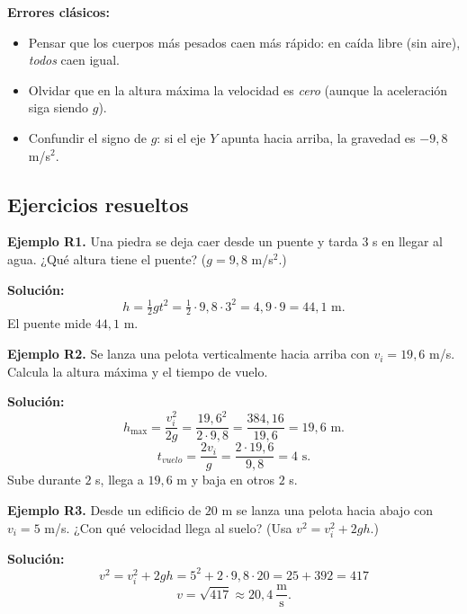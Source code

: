 \documentclass[12pt, letterpaper]{article}
\begin{document}
\begin{cuadroadvertencia}
  \textbf{Errores clásicos:}
  \begin{itemize}[leftmargin=*]
    \item Pensar que los cuerpos más pesados caen más rápido: en caída libre (sin aire), \emph{todos} caen igual.
    \item Olvidar que en la altura máxima la velocidad es \emph{cero} (aunque la aceleración siga siendo $g$).
    \item Confundir el signo de $g$: si el eje $Y$ apunta hacia arriba, la gravedad es $-9{,}8$ m/s$^2$.
  \end{itemize}
\end{cuadroadvertencia}

\subsection{Ejercicios resueltos}

\textbf{Ejemplo R1.} Una piedra se deja caer desde un puente y tarda $3$ s en llegar al agua. ¿Qué altura tiene el puente? ($g = 9{,}8$ m/s$^2$.)

\begin{cuadrosolucion}
  \textbf{Solución:}
  $$h = \tfrac{1}{2} g t^2 = \tfrac{1}{2} \cdot 9{,}8 \cdot 3^2 = 4{,}9 \cdot 9 = 44{,}1 \text{ m}.$$
  El puente mide $44{,}1$ m.
\end{cuadrosolucion}

\textbf{Ejemplo R2.} Se lanza una pelota verticalmente hacia arriba con $v_i = 19{,}6$ m/s. Calcula la altura máxima y el tiempo de vuelo.

\begin{cuadrosolucion}
  \textbf{Solución:}
  $$h_{\max} = \frac{v_i^2}{2g} = \frac{19{,}6^2}{2 \cdot 9{,}8} = \frac{384{,}16}{19{,}6} = 19{,}6 \text{ m}.$$
  $$t_{vuelo} = \frac{2 v_i}{g} = \frac{2 \cdot 19{,}6}{9{,}8} = 4 \text{ s}.$$
  Sube durante $2$ s, llega a $19{,}6$ m y baja en otros $2$ s.
\end{cuadrosolucion}

\textbf{Ejemplo R3.} Desde un edificio de $20$ m se lanza una pelota hacia abajo con $v_i = 5$ m/s. ¿Con qué velocidad llega al suelo? (Usa $v^2 = v_i^2 + 2gh$.)

\begin{cuadrosolucion}
  \textbf{Solución:}
  $$v^2 = v_i^2 + 2 g h = 5^2 + 2 \cdot 9{,}8 \cdot 20 = 25 + 392 = 417$$
  $$v = \sqrt{417} \approx 20{,}4 \ \frac{\text{m}}{\text{s}}.$$
\end{cuadrosolucion}
\end{document}
